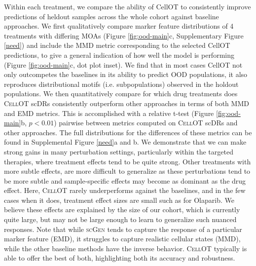 Within each treatment, we compare the ability of CellOT to consistently improve predictions of heldout samples across the whole cohort against baseline approaches.
We first qualitatively compare marker feature distributions of 4 treatments with differing MOAs (Figure \ref{fig:ood-main}c, Supplementary Figure \ref{need}) and include the MMD metric corresponding to the selected CellOT predictions, to give a general indication of how well the model is performing (Figure \ref{fig:ood-main}c, dot plot inset).
We find that in most cases CellOT not only outcompetes the baselines in its ability to predict OOD populations, it also reproduces distributional motifs (i.e. subpopulations) observed in the holdout populations.
We then quantitatively compare for which drug treatments does \textsc{CellOT} scDRs consistently outperform other approaches in terms of both MMD and EMD metrics.
This is accomplished with a relative t-test (Figure \ref{fig:ood-main}b, $p < 0.01$) pairwise between metrics computed on \textsc{CellOT} scDRs and other approaches.
The full distributions for the differences of these metrics can be found in Supplemental Figure \ref{need}a and b.
We demonstrate that we can make strong gains in many perturbation settings, particularly within the targeted therapies, where treatment effects tend to be quite strong.
Other treatments with more subtle effects, are more difficult to generalize as these perturbations tend to be more subtle and sample-specific effects may become as dominant as the drug effect.
Here, \textsc{CellOT} rarely underperforms against the baselines, and in the few cases when it does, treatment effect sizes are small such as for Olaparib.
We believe these effects are explained by the size of our cohort, which is currently quite large, but may not be large enough to learn to generalize such nuanced responses.
Note that while \textsc{scGen} tends to capture the response of a particular marker feature (EMD), it struggles to capture realistic cellular states (MMD), while the other baseline methods have the inverse behavior.
\textsc{CellOT} typically is able to offer the best of both, highlighting both its accuracy and robustness.

